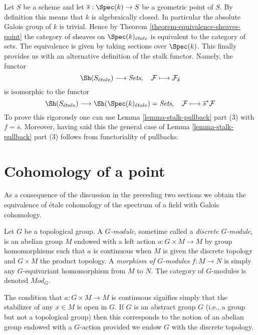 \begin{remark}
\label{remark-stalk-pullback}
Let $S$ be a scheme and let $\overline{s} : \Spec(k) \to S$
be a geometric point of $S$. By definition this means that $k$
is algebraically closed. In particular the absolute Galois group of $k$
is trivial. Hence by
Theorem \ref{theorem-equivalence-sheaves-point}
the category of sheaves on $\Spec(k)_{\acute{e}tale}$ is equivalent
to the category of sets. The equivalence is given by taking
sections over $\Spec(k)$. This finally provides us with an
alternative definition of the stalk functor. Namely, the functor
$$
\Sh(S_{\acute{e}tale}) \longrightarrow \textit{Sets}, \quad
\mathcal{F} \longmapsto \mathcal{F}_{\overline{s}}
$$
is isomorphic to the functor
$$
\Sh(S_{\acute{e}tale})
\longrightarrow
\Sh(\Spec(k)_{\acute{e}tale}) = \textit{Sets},
\quad
\mathcal{F} \longmapsto \overline{s}^*\mathcal{F}
$$
To prove this rigorously one can use
Lemma \ref{lemma-stalk-pullback} part (3)
with $f = \overline{s}$. Moreover, having said this the general case of
Lemma \ref{lemma-stalk-pullback} part (3)
follows from functoriality of pullbacks.
\end{remark}




\section{Cohomology of a point}
\label{section-cohomology-point}

\noindent
As a consequence of the discussion in the preceding two sections
we obtain the equivalence of \'etale cohomology of the spectrum of a
field with Galois cohomology.

\begin{definition}
\label{definition-G-module-continuous}
Let $G$ be a topological group.
A {\it $G$-module}, sometime called a {\it discrete $G$-module},
is an abelian group $M$ endowed with a left action $a : G \times M \to M$
by group homomorphisms such that $a$ is continuous when $M$ is given the
discrete topology and $G \times M$ the product topology.
A {\it morphism of $G$-modules} $f : M \to N$ is simply any $G$-equivariant
homomorphism from $M$ to $N$.
The category of $G$-modules is denoted {\it $\textit{Mod}_G$}.
\end{definition}

\noindent
The condition that $a : G \times M \to M$ is continuous signifies
simply that the stabilizer of any  $x \in M$ is open in $G$.
If $G$ is an abstract group $G$ (i.e., a group but not a topological group)
then this corresponds to the notion of an abelian group endowed with
a $G$-action provided we endow $G$ with the discrete topology.

